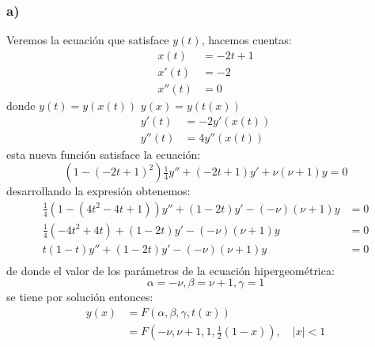 \documentclass{article}
\begin{document}
\begin{tcolorbox}[breakable]
    \subsubsection*{a)}
        Veremos la ecuación que satisface $y(t)$, hacemos cuentas:
        \begin{align*}
            x(t) &= -2t+1 \\
            x'(t) &= -2 \\
            x''(t) &= 0
        \end{align*}
        donde $y(t) = y(x(t))$ $y(x) = y(t(x))$
        \begin{align*}
            y'(t) &= -2y'(x(t)) \\
            y''(t) &= 4y''(x(t))
        \end{align*}
        esta nueva función satisface la ecuación:
        \[ (1-(-2t+1)^2)\tfrac{1}{4}y'' + (-2t+1)y' + \nu(\nu+1)y = 0 \]
        desarrollando la expresión obtenemos:
        \begin{align*}
            \tfrac{1}{4}(1-(4t^2-4t+1))y'' + (1-2t)y' - (-\nu)(\nu+1)y &= 0 \\
            \tfrac{1}{4}(-4t^2+4t) + (1-2t)y' - (-\nu)(\nu+1)y &= 0 \\
            t(1-t)y'' + (1-2t)y' - (-\nu)(\nu+1)y &= 0 \\
        \end{align*}
        de donde el valor de los parámetros de la ecuación hipergeométrica:
        \[ \alpha = -\nu, \beta = \nu+1, \gamma = 1 \]
        se tiene por solución entonces:
        \begin{align*}
            y(x) 
            &= F(\alpha,\beta,\gamma, t(x)) \\
            &= F(-\nu, \nu+1, 1, \tfrac{1}{2}(1-x)), \quad |x|<1
        \end{align*}

\end{tcolorbox}
\end{document}
